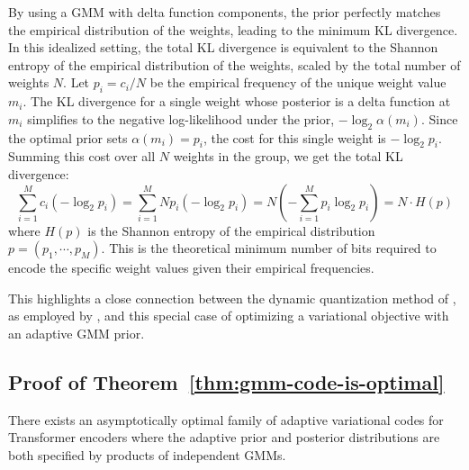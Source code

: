  By using a GMM with delta function components, the prior perfectly matches the empirical distribution of the weights, leading to the minimum KL divergence.
In this idealized setting, the total KL divergence is equivalent to the Shannon entropy of the empirical distribution of the weights, scaled by the total number of weights $N$. Let $p_i = c_i / N$ be the empirical frequency of the unique weight value $m_i$. The KL divergence for a single weight whose posterior is a delta function at $m_i$ simplifies to the negative log-likelihood under the prior, $-\log_2 \alpha(m_i)$. Since the optimal prior sets $\alpha(m_i) = p_i$, the cost for this single weight is $-\log_2 p_i$. Summing this cost over all $N$ weights in the group, we get the total KL divergence:
\begin{equation*}
\sum_{i=1}^{M} c_i (-\log_2 p_i) = \sum_{i=1}^{M} N p_i (-\log_2 p_i) = N \left( -\sum_{i=1}^{M} p_i \log_2 p_i \right) = N \cdot H(p)
\end{equation*}
where $H(p)$ is the Shannon entropy of the empirical distribution $p = (p_1, \cdots, p_M)$. This is the theoretical minimum number of bits required to encode the specific weight values given their empirical frequencies.

This highlights a close connection between the dynamic quantization method of \citet{han2016deep}, as employed by \citet{lotfi2022pac,lotfi2024non}, and this special case of optimizing a variational objective with an adaptive GMM prior.

\subsection{Proof of Theorem~\ref{thm:gmm-code-is-optimal}}
\label{sec:transformer-var-code-details}

\begin{thm*} There exists an asymptotically optimal family of adaptive variational codes for Transformer encoders where the adaptive prior and posterior distributions are both specified by products of independent GMMs.
\end{thm*}

